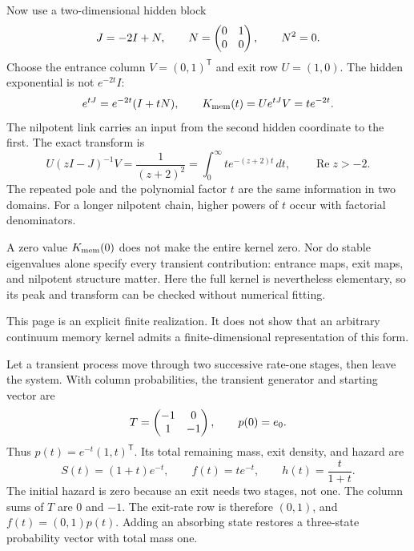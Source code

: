 Now use a two-dimensional hidden block
\[
J=-2I+N,\qquad N=\begin{pmatrix}0&1\\0&0\end{pmatrix},\qquad N^2=0.
\]
Choose the entrance column $V=(0,1)^{\mathsf T}$ and exit row $U=(1,0)$. The hidden exponential is not $e^{-2t}I$:
\[
e^{tJ}=e^{-2t}(I+tN),
\qquad K_{\rm mem}(t)=Ue^{tJ}V=t e^{-2t}.
\]
The nilpotent link carries an input from the second hidden coordinate to the first.
The exact transform is
\[
U(zI-J)^{-1}V=\frac1{(z+2)^2}
=\int_0^\infty t e^{-(z+2)t}\,dt,
\qquad \operatorname{Re}z>-2.
\]
The repeated pole and the polynomial factor $t$ are the same information in two domains. For a longer nilpotent chain, higher powers of $t$ occur with factorial denominators.

A zero value $K_{\rm mem}(0)$ does not make the entire kernel zero. Nor do stable eigenvalues alone specify every transient contribution: entrance maps, exit maps, and nilpotent structure matter. Here the full kernel is nevertheless elementary, so its peak and transform can be checked without numerical fitting.

This page is an explicit finite realization. It does not show that an arbitrary continuum memory kernel admits a finite-dimensional representation of this form.

Let a transient process move through two successive rate-one stages, then leave the system. With column probabilities, the transient generator and starting vector are
\[
T=\begin{pmatrix}-1&0\\1&-1\end{pmatrix},\qquad p(0)=e_0.
\]
Thus $p(t)=e^{-t}(1,t)^{\mathsf T}$. Its total remaining mass, exit density, and hazard are
\[
S(t)=(1+t)e^{-t},\qquad f(t)=t e^{-t},
\qquad h(t)=\frac{t}{1+t}.
\]
The initial hazard is zero because an exit needs two stages, not one.
The column sums of $T$ are $0$ and $-1$. The exit-rate row is therefore $(0,1)$, and $f(t)=(0,1)p(t)$. Adding an absorbing state restores a three-state probability vector with total mass one.

